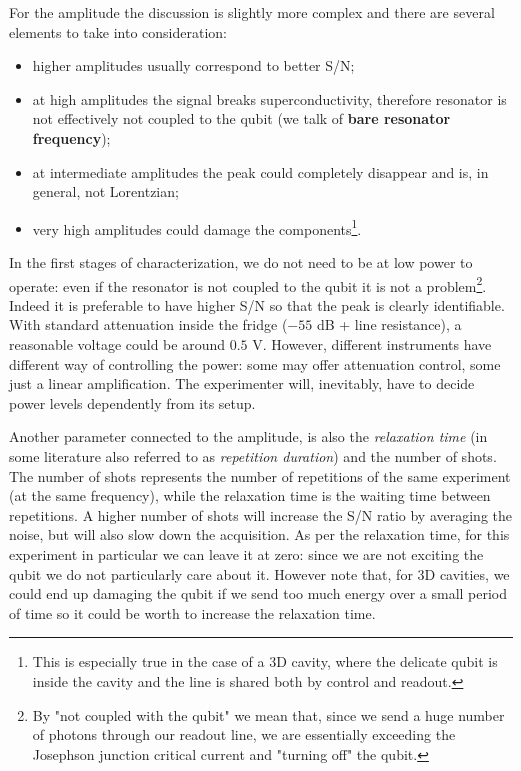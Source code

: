 For the amplitude the discussion is slightly more complex and there are several elements to take into consideration:
\begin{itemize}
    \item higher amplitudes usually correspond to better S/N;
    \item at high amplitudes the signal breaks superconductivity, therefore resonator is not effectively not coupled to the qubit (we talk of \textbf{bare resonator frequency});
    \item at intermediate amplitudes the peak could completely disappear and is, in general, not Lorentzian;
    \item very high amplitudes could damage the components\footnote{This is especially true in the case of a 3D cavity, where the delicate qubit is inside the cavity and the line is shared both by control and readout.}.
\end{itemize}

In the first stages of characterization, we do not need to be at low power to operate: even if the resonator is not coupled to the qubit it is not a problem\footnote{By "not coupled with the qubit" we mean that, since we send a huge number of photons through our readout line, we are essentially exceeding the Josephson junction critical current and "turning off" the qubit.}.
Indeed it is preferable to have higher S/N so that the peak is clearly identifiable.
With standard attenuation inside the fridge ($-55$ dB + line resistance), a reasonable voltage could be around $0.5$ V. 
However, different instruments have different way of controlling the power: some may offer attenuation control, some just a linear amplification. 
The experimenter will, inevitably, have to decide power levels dependently from its setup.

Another parameter connected to the amplitude, is also the \textit{relaxation time} (in some literature also referred to as \textit{repetition duration}) and the number of shots.
The number of shots represents the number of repetitions of the same experiment (at the same frequency), while the relaxation time is the waiting time between repetitions.
A higher number of shots will increase the S/N ratio by averaging the noise, but will also slow down the acquisition.
As per the relaxation time, for this experiment in particular we can leave it at zero: since we are not exciting the qubit we do not particularly care about it. 
However note that, for 3D cavities, we could end up damaging the qubit if we send too much energy over a small period of time so it could be worth to increase the relaxation time.

